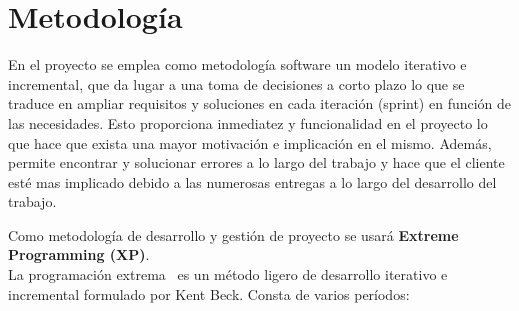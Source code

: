 \chapter{Metodología}
\label{cap:Metodologia}

En el proyecto se emplea como metodología software un modelo iterativo e incremental,
que da lugar a una toma de decisiones a corto plazo lo que se traduce en ampliar requisitos y
soluciones en cada iteración (sprint) en función de las necesidades. Esto proporciona inmediatez
y funcionalidad en el proyecto lo que hace que exista una mayor motivación e implicación en
el mismo. Además, permite encontrar y solucionar errores a lo largo del trabajo y hace que el
cliente esté mas implicado debido a las numerosas entregas a lo largo del desarrollo del trabajo.

Como metodología de desarrollo y gestión de proyecto se usará \textbf{Extreme Programming (XP)}.\\
La programación extrema~\cite{Newk02} es un método ligero de desarrollo iterativo e incremental formulado por Kent Beck. Consta de varios períodos:
